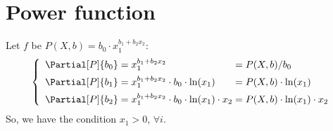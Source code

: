 \documentclass[10pt,english,a4paper]{article}
\newcommand{\PP}{b}
\newcommand{\myF}[1]{#1(X, \PP)}
\newcommand{\mtrc}[1]{x_{#1}}
\begin{document}
\section{Power function}

\newcommand{\Pbase}{\mtrc{1}^{ \PP_1 + \PP_2 \mtrc{2}}}%
\newcommand{\Pinner}{\PP_0\cdot\ln(\mtrc{1})}

Let $f$ be $\myF{P} = \PP_0\cdot\Pbase$:
$$
	\left\{\begin{array}{c@{\;=\;}l@{\;=\;}l}
		\Partial[P]{\PP_0}	& \Pbase							& \myF{P} / \PP_0					\\[0.5em]
		\Partial[P]{\PP_1}	& \Pbase\cdot\Pinner				& \myF{P}\cdot\ln(\mtrc{1})			\\[0.5em]
		\Partial[P]{\PP_2}	& \Pbase\cdot\Pinner\cdot\mtrc{2}	& \myF{P}\cdot\ln(\mtrc{1})\cdot\mtrc{2}
	\end{array}\right.
$$
So, we have the condition $\mtrc{1} > 0$, $\forall i$.
\end{document}
